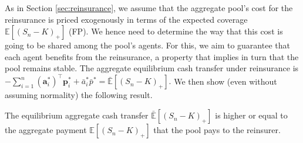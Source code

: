 \documentclass[fleqn,mnsc,nonblindrev]{informs4}
\newcommand{\EE}{\mathbb{E}}
\newcommand{\tb}[1]{\textbf{#1}}
\begin{document}
 

As in Section \ref{sec:reinsurance}, we assume that the aggregate pool's cost for the reinsurance is priced exogenously in terms of the expected coverage $\EE[(S_n-K)_+]$ (FP). We hence need to determine the way that this cost is going to be shared among the pool's agents. For this, we aim to guarantee that each agent benefits from the reinsurance, a property that implies in turn that the pool remains stable. The aggregate equilibrium cash transfer under reinsurance is   {$-\sum_{i=1}^n(\tb{a}_{i}^*)^\top \tb{p}_{i}^*+\bar{a}_i^*\bar{p}^*=\bar{\EE}[(S_n-K)_+].$}
We then show (even without assuming normality) the following result.
\begin{theorem}\label{thm:reinsurance cost}
The equilibrium aggregate cash transfer   {$\bar{\EE}[(S_n-K)_+]$} is higher or equal to the aggregate payment $\EE[(S_n-K)_+]$ that the pool pays to the reinsurer.
\end{theorem}
\end{document}
